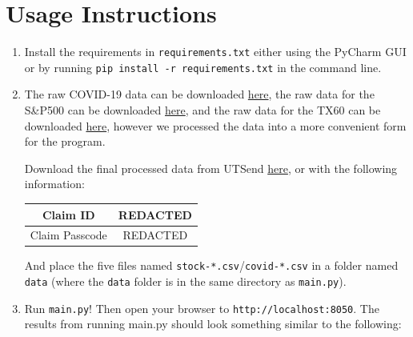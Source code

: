\documentclass[fontsize=11pt]{article}
\begin{document}
\section*{Usage Instructions}

\begin{enumerate}
    \item Install the requirements in \texttt{requirements.txt} either using the PyCharm GUI or by running \texttt{pip install -r requirements.txt} in the command line.
    
    \item The raw COVID-19 data can be downloaded \href{https://github.com/owid/covid-19-data/blob/master/public/data/owid-covid-data.csv}{here}, the raw data for the S\&P500 can be downloaded \href{https://finance.yahoo.com/quote/\%5EGSPC/history?p=\%5EGSPC}{here}, and the raw data for the TX60 can be downloaded \href{https://ca.investing.com/indices/s-p-tsx-60-historical-data}{here}, however we processed the data into a more convenient form for the program.
    
    Download the final processed data from UTSend \href{http://REDACTED}{here}, or with the following information:
    
    \begin{center}
    \begin{tabular}{|c|c|}
        \hline
        Claim ID & REDACTED \\
        \hline
        Claim Passcode & REDACTED \\
        \hline
    \end{tabular}
    \end{center}
    
    And place the five files named \texttt{stock-*.csv}/\texttt{covid-*.csv} in a folder named \texttt{data} (where the \texttt{data} folder is in the same directory as \texttt{main.py}).
    
    \item Run \texttt{main.py}!
    Then open your browser to \texttt{http://localhost:8050}.
    The results from running main.py should look something similar to the following:
    

\end{enumerate}
\end{document}
